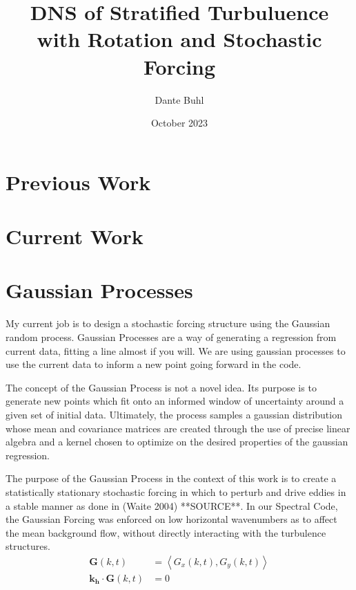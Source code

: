 \documentclass{article}
\title{DNS of Stratified Turbuluence with Rotation and Stochastic Forcing}
\author{Dante Buhl}
\date{October 2023}
\begin{document}
\newcommand{\bs}[1]{\boldsymbol{#1}}
\newcommand{\R}{\mathbb{R}}


\maketitle

\section{Previous Work}


\section{Current Work}


\section{Gaussian Processes}
\begin{comment}
    
\end{comment}

My current job is to design a stochastic forcing structure using the Gaussian random process. Gaussian Processes are a way of generating a regression from current data, fitting a line almost if you will. We are using gaussian processes to use the current data to inform a new point going forward in the code. 

The concept of the Gaussian Process is not a novel idea. Its purpose is to generate new points which fit onto an informed window of uncertainty around a given set of initial data. Ultimately, the process samples a gaussian distribution whose mean and covariance matrices are created through the use of precise linear algebra and a kernel chosen to optimize on the desired properties of the gaussian regression. 

The purpose of the Gaussian Process in the context of this work is to create a statistically stationary stochastic forcing in which to perturb and drive eddies in a stable manner as done in (Waite 2004) **SOURCE**. In our Spectral Code, the Gaussian Forcing was enforced on low horizontal wavenumbers as to affect the mean background flow, without directly interacting with the turbulence structures.
\begin{align*}
    \bs{G}(k, t) &= \left<G_x(k, t), G_y(k, t)\right> \\
    \bs{k_h} \cdot  \bs{G}(k, t) &= 0
\end{align*}
\end{document}

